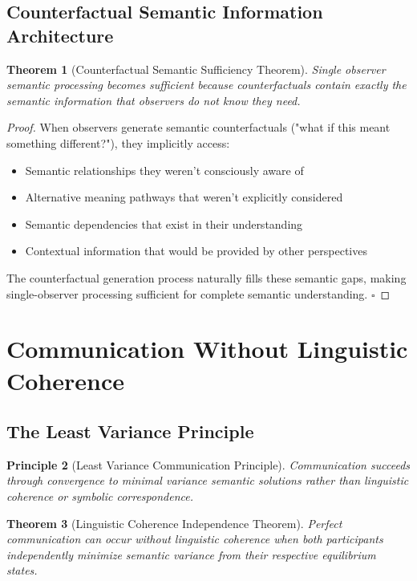 \documentclass[11pt,a4paper]{article}
\newtheorem{theorem}{Theorem}[section]
\newtheorem{principle}[theorem]{Principle}
\begin{document}
\subsection{Counterfactual Semantic Information Architecture}

\begin{theorem}[Counterfactual Semantic Sufficiency Theorem]
Single observer semantic processing becomes sufficient because counterfactuals contain exactly the semantic information that observers do not know they need.
\end{theorem}

\begin{proof}
When observers generate semantic counterfactuals ("what if this meant something different?"), they implicitly access:
\begin{itemize}
\item Semantic relationships they weren't consciously aware of
\item Alternative meaning pathways that weren't explicitly considered  
\item Semantic dependencies that exist in their understanding
\item Contextual information that would be provided by other perspectives
\end{itemize}

The counterfactual generation process naturally fills these semantic gaps, making single-observer processing sufficient for complete semantic understanding. $\square$
\end{proof}

\section{Communication Without Linguistic Coherence}

\subsection{The Least Variance Principle}

\begin{principle}[Least Variance Communication Principle]
Communication succeeds through convergence to minimal variance semantic solutions rather than linguistic coherence or symbolic correspondence.
\end{principle}

\begin{theorem}[Linguistic Coherence Independence Theorem]
Perfect communication can occur without linguistic coherence when both participants independently minimize semantic variance from their respective equilibrium states.
\end{theorem}
\end{document}
